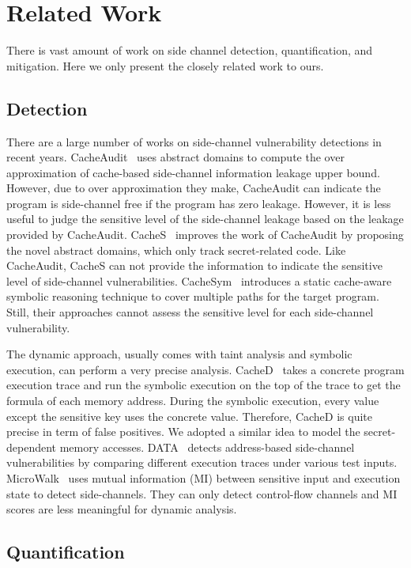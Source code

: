 \section{Related Work}

There is vast amount of work on side channel detection,
quantification, and mitigation. Here we only present the closely
related work to ours.

\subsection{Detection}

There are a large number of works on side-channel vulnerability
detections in recent years.  CacheAudit~\cite{182946} uses abstract
domains to compute the over approximation of cache-based side-channel
information leakage upper bound. However, due to over approximation they make,
CacheAudit can indicate the program is
side-channel free if the program has zero leakage.  However, it is
less useful to judge the sensitive level of the side-channel leakage
based on the leakage provided by CacheAudit. CacheS~\cite{236338}
improves the work of CacheAudit by proposing the novel abstract
domains, which only track secret-related code. Like CacheAudit, CacheS
can not provide the information to indicate the sensitive level of
side-channel vulnerabilities. CacheSym~\cite{Brotzman19Casym} introduces
a static cache-aware symbolic reasoning technique to cover multiple
paths for the target program. Still, their approaches cannot assess
the sensitive level for each side-channel vulnerability.

The dynamic approach, usually comes with taint analysis and symbolic
execution, can perform a very precise analysis. CacheD~\cite{203878}
takes a concrete program execution trace and run the symbolic
execution on the top of the trace to get the formula of each memory
address. During the symbolic execution, every value except the
sensitive key uses the concrete value. Therefore, CacheD is quite
precise in term of false positives. We adopted a similar idea to model
the secret-dependent memory accesses. DATA~\cite{217537} detects
address-based side-channel vulnerabilities by comparing different
execution traces under various test
inputs. MicroWalk~\cite{Wichelmann:2018:MFF:3274694.3274741} uses
mutual information (MI) between sensitive input and execution state to
detect side-channels. They can only detect control-flow channels and
MI scores are less meaningful for dynamic analysis.

\subsection{Quantification}

